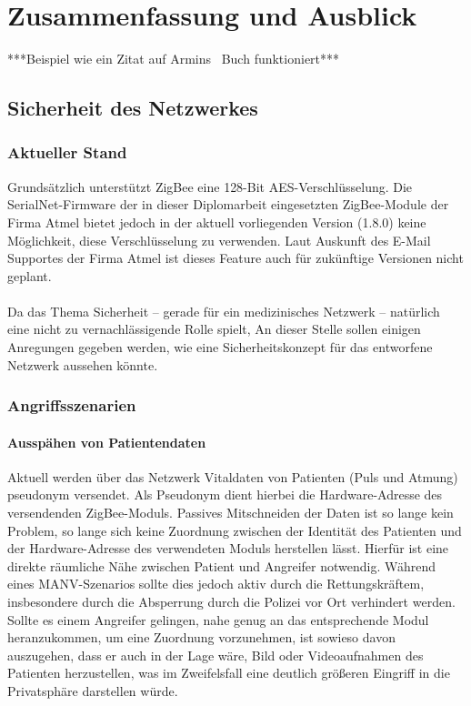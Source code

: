 
\chapter{Zusammenfassung und Ausblick}
***Beispiel wie ein Zitat auf Armins~\citep{Bolz} Buch funktioniert***

\section{Sicherheit des Netzwerkes}
\label{Sicherheit}
\subsection{Aktueller Stand}
Grundsätzlich unterstützt ZigBee eine 128-Bit AES-Verschlüsselung. Die SerialNet-Firmware der in dieser Diplomarbeit
eingesetzten ZigBee-Module der Firma Atmel bietet jedoch in der aktuell vorliegenden Version (1.8.0) keine Möglichkeit,
diese Verschlüsselung zu verwenden. Laut Auskunft des E-Mail Supportes der Firma Atmel ist dieses Feature auch für
zukünftige Versionen nicht geplant.\\
\\
Da das Thema Sicherheit -- gerade für ein medizinisches Netzwerk -- natürlich eine nicht zu vernachlässigende Rolle spielt,
An dieser Stelle sollen einigen Anregungen gegeben werden, wie eine Sicherheitskonzept für das entworfene Netzwerk aussehen 
könnte.

\subsection{Angriffsszenarien}

\subsubsection{Ausspähen von Patientendaten}
Aktuell werden über das Netzwerk Vitaldaten von Patienten (Puls und Atmung) pseudonym versendet. Als Pseudonym dient 
hierbei die Hardware-Adresse des versendenden ZigBee-Moduls. Passives Mitschneiden der Daten ist so lange kein Problem,
so lange sich keine Zuordnung zwischen der Identität des Patienten und der Hardware-Adresse des verwendeten Moduls
herstellen lässt. Hierfür ist eine direkte räumliche Nähe zwischen Patient und Angreifer notwendig. 
Während eines MANV-Szenarios sollte dies jedoch aktiv durch die Rettungskräftem, insbesondere durch die Absperrung durch
die Polizei vor Ort verhindert werden. Sollte es einem Angreifer gelingen, nahe genug an das entsprechende Modul
heranzukommen, um eine Zuordnung vorzunehmen, ist sowieso davon auszugehen, dass er auch in der Lage wäre, Bild oder
Videoaufnahmen des Patienten herzustellen, was im Zweifelsfall eine deutlich größeren Eingriff in die Privatsphäre 
darstellen würde.

